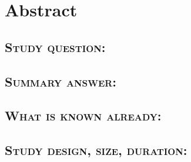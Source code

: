 \section*{Abstract}





\subsection*{\textsc{Study question:}} 

\subsection*{\textsc{Summary answer:}}  

\subsection*{\textsc{What is known already:}} 

\subsection*{\textsc{Study design, size, duration:}} 

